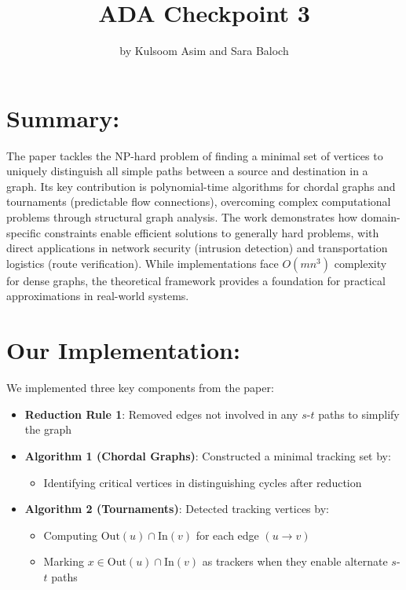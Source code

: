 \documentclass{article}
\title{ADA Checkpoint 3}
\author{by Kulsoom Asim and Sara Baloch}
\date{}
\begin{document}
\maketitle

\section*{Summary:}
The paper tackles the NP-hard problem of finding a minimal set of vertices to uniquely distinguish all simple paths between a source and destination in a graph. Its key contribution is polynomial-time algorithms for chordal graphs and tournaments (predictable flow connections), overcoming complex computational problems through structural graph analysis. The work demonstrates how domain-specific constraints enable efficient solutions to generally hard problems, with direct applications in network security (intrusion detection) and transportation logistics (route verification). While implementations face $O(mn^3)$ complexity for dense graphs, the theoretical framework provides a foundation for practical approximations in real-world systems.

\section*{Our Implementation:}
We implemented three key components from the paper:

\begin{itemize}
    \item \textbf{Reduction Rule 1}: Removed edges not involved in any $s$-$t$ paths to simplify the graph
    
    \item \textbf{Algorithm 1 (Chordal Graphs)}: Constructed a minimal tracking set by:
    \begin{itemize}
        \item Identifying critical vertices in distinguishing cycles after reduction
    \end{itemize}
    
    \item \textbf{Algorithm 2 (Tournaments)}: Detected tracking vertices by:
    \begin{itemize}
        \item Computing $\text{Out}(u) \cap \text{In}(v)$ for each edge $(u \rightarrow v)$
        \item Marking $x \in \text{Out}(u) \cap \text{In}(v)$ as trackers when they enable alternate $s$-$t$ paths
    \end{itemize}
\end{itemize}
\end{document}
